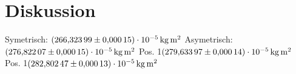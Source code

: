 \section{Diskussion}
\label{sec:Diskussion}


Symetrisch: $\SI{266.32399 (00015)e-5}{\kilo\gram\square\m}$
Asymetrisch: $\SI{276.82207 (00015)e-5}{\kilo\gram\square\m}$
Pos. 1$\SI{279.63397 (00014)e-5}{\kilo\gram\square\m}$
Pos. 1$\SI{282.80247 (00013)e-5}{\kilo\gram\square\m}$

